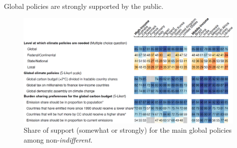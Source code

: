 \documentclass[aspectratio=169,xcolor=dvipsnames, 11pt,mathserif]{beamer}
\begin{document}


\begin{frame}{Global policies are strongly supported by the public.\label{global_policies}}
	\vspace{-.3cm}
	\begin{figure}[h!]
		\centering		
		\caption{Share of support (somewhat or strongly) for the main global policies among non-\textit{indifferent}.  \hyperlink{national_policies}{} \hyperlink{national_policies}{}%
        }
        \vspace{-.2cm}
		\includegraphics[height=.9\textheight]{../figures/OECD/Heatplot_global_tax_attitudes_share_wo_TD.png} %
		\end{figure}
\end{frame}
\end{document}
